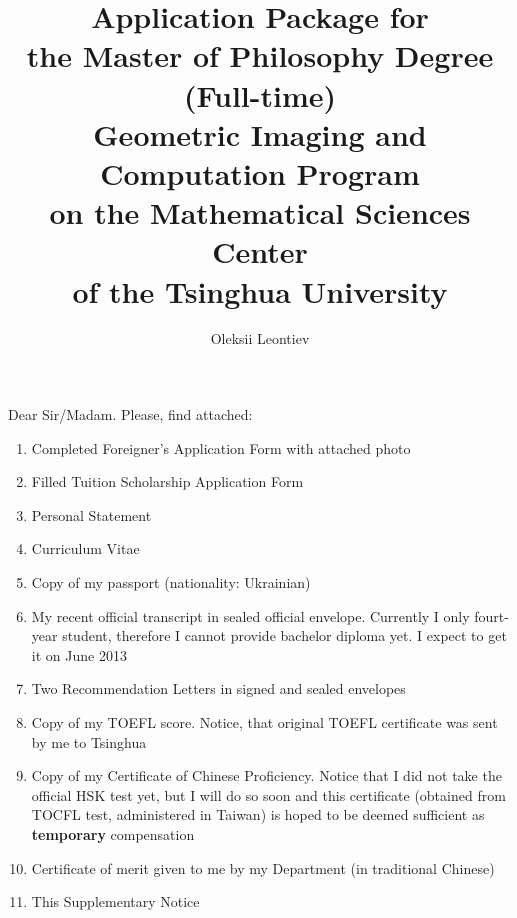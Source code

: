 \documentclass[8pt]{article} %
\title{Application Package for\\the Master of Philosophy Degree (Full-time)\\ Geometric Imaging and Computation Program
\\on the Mathematical Sciences Center
 \\of the Tsinghua University}
\author{Oleksii Leontiev}
\begin{document}
\begin{CJK}{UTF8}{bsmi}
\maketitle
\end{CJK}

Dear Sir/Madam. Please, find attached:
\begin{enumerate}
	\item{Completed Foreigner's Application Form with attached photo}
	\item{Filled Tuition Scholarship Application Form}
	\item{Personal Statement}
	\item{Curriculum Vitae}
	\item{Copy of my passport (nationality: Ukrainian)}
	\item{My recent official transcript in sealed official envelope. Currently I only fourt-year student, therefore I cannot provide bachelor diploma yet. I expect to get it on June 2013}
	\item{Two Recommendation Letters in signed and sealed envelopes}
	\item{Copy of my TOEFL score. Notice, that original TOEFL certificate was sent by me to Tsinghua}
	\item{Copy of my Certificate of Chinese Proficiency. Notice that I did not take the official HSK test yet, but I will do so soon and
	 this certificate
	(obtained from TOCFL test, administered in Taiwan) is hoped to be deemed sufficient as \textbf{temporary} compensation}
	\item{Certificate of merit given to me by my Department (in traditional Chinese)}
	\item{This Supplementary Notice}
\end{enumerate}
\end{document}
